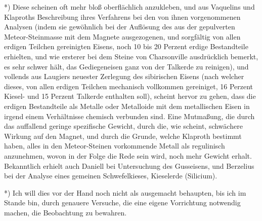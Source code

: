 \documentclass[a4paper, 11pt, oneside, german]{article}
\begin{document}
*) Diese scheinen oft mehr bloß oberflächlich anzukleben, und aus Vaquelins und Klaproths Beschreibung ihres Verfahrens bei den von ihnen vorgenommenen Analysen (indem sie gewöhnlich bei der Auflösung des aus der gepulverten Meteor-Steinmasse mit dem Magnete ausgezogenen, und sorgfältig von allen erdigen Teilchen gereinigten Eisens, noch 10 bis 20 Perzent erdige Bestandteile erhielten, und wie ersterer bei dem Steine von Charsonville ausdrücklich bemerkt, es sehr schwer hält, das Gediegeneisen ganz von der Talkerde zu reinigen), und vollends aus Laugiers neuester Zerlegung des sibirischen Eisens (nach welcher dieses, von allen erdigen Teilchen mechanisch vollkommen gereiniget, 16 Perzent Kiesel- und 15 Perzent Talkerde enthalten soll), scheint hervor zu gehen, dass die erdigen Bestandteile als Metalle oder Metalloide mit dem metallischen Eisen in irgend einem Verhältnisse chemisch verbunden sind. Eine Mutmaßung, die durch das auffallend geringe spezifische Gewicht, durch die, wie scheint, schwächere Wirkung auf den Magnet, und durch die Grunde, welche Klaproth bestimmt haben, alles in den Meteor-Steinen vorkommende Metall als regulinisch anzunehmen, wovon in der Folge die Rede sein wird, noch mehr Gewicht erhalt. Bekanntlich erhielt auch Daniell bei Untersuchung des Gusseisens, und Berzelius bei der Analyse eines gemeinen Schwefelkieses, Kieselerde (Silicium).

*) Ich will dies vor der Hand noch nicht als ausgemacht behaupten, bis ich im Stande bin, durch genauere Versuche, die eine eigene Vorrichtung notwendig machen, die Beobachtung zu bewahren.
\end{document}
